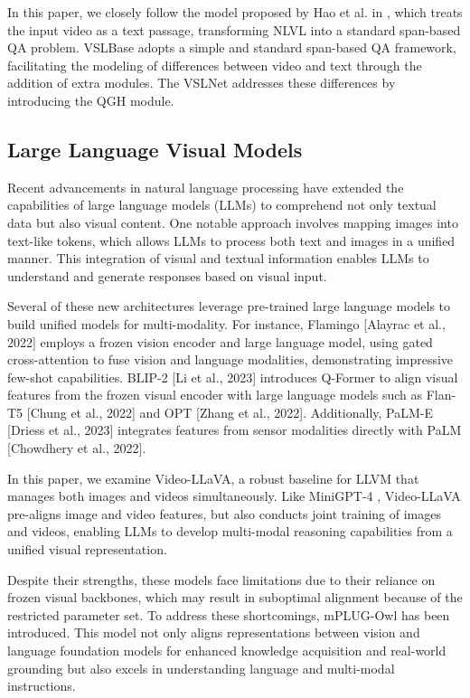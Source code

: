 \documentclass[conference]{IEEEtran}
\begin{document}
In this paper, we closely follow the model proposed by Hao et al. in \cite{b3}, which treats the input video as a text passage, transforming NLVL into a standard span-based QA problem. VSLBase adopts a simple and standard span-based QA framework, facilitating the modeling of differences between video and text through the addition of extra modules. The VSLNet addresses these differences by introducing the QGH module.



\subsection{Large Language Visual Models}
Recent advancements in natural language processing have extended the capabilities of large language models (LLMs) to comprehend not only textual data but also visual content. One notable approach involves mapping images into text-like tokens, which allows LLMs to process both text and images in a unified manner. This integration of visual and textual information enables LLMs to understand and generate responses based on visual input.

Several of these new architectures leverage pre-trained large language models to build unified models for multi-modality. For instance, Flamingo [Alayrac et al., 2022] employs a frozen vision encoder and large language model, using gated cross-attention to fuse vision and language modalities, demonstrating impressive few-shot capabilities. BLIP-2 [Li et al., 2023] introduces Q-Former to align visual features from the frozen visual encoder with large language models such as Flan-T5 [Chung et al., 2022] and OPT [Zhang et al., 2022]. Additionally, PaLM-E [Driess et al., 2023] integrates features from sensor modalities directly with PaLM [Chowdhery et al., 2022].

In this paper, we examine Video-LLaVA, a robust baseline for LLVM that manages both images and videos simultaneously. Like MiniGPT-4 \cite{b6}, Video-LLaVA pre-aligns image and video features, but also conducts joint training of images and videos, enabling LLMs to develop multi-modal reasoning capabilities from a unified visual representation.

Despite their strengths, these models face limitations due to their reliance on frozen visual backbones, which may result in suboptimal alignment because of the restricted parameter set. To address these shortcomings, mPLUG-Owl \cite{b7} has been introduced. This model not only aligns representations between vision and language foundation models for enhanced knowledge acquisition and real-world grounding but also excels in understanding language and multi-modal instructions.
\end{document}
